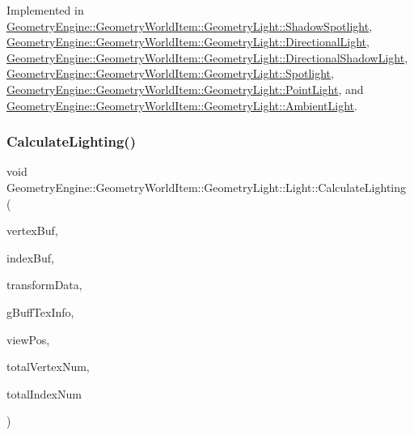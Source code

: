 Implemented in \mbox{\hyperlink{class_geometry_engine_1_1_geometry_world_item_1_1_geometry_light_1_1_shadow_spotlight_a27163f2f8903220d7eaae7aa70c9d6e6}{Geometry\+Engine\+::\+Geometry\+World\+Item\+::\+Geometry\+Light\+::\+Shadow\+Spotlight}}, \mbox{\hyperlink{class_geometry_engine_1_1_geometry_world_item_1_1_geometry_light_1_1_directional_light_af1eac6f1aac9388efe95e1a898cf600f}{Geometry\+Engine\+::\+Geometry\+World\+Item\+::\+Geometry\+Light\+::\+Directional\+Light}}, \mbox{\hyperlink{class_geometry_engine_1_1_geometry_world_item_1_1_geometry_light_1_1_directional_shadow_light_a712d0b0a0573ebd246a4a8aa6b2b667a}{Geometry\+Engine\+::\+Geometry\+World\+Item\+::\+Geometry\+Light\+::\+Directional\+Shadow\+Light}}, \mbox{\hyperlink{class_geometry_engine_1_1_geometry_world_item_1_1_geometry_light_1_1_spotlight_a6136ca2338a7b5f5be70ccab82fe655e}{Geometry\+Engine\+::\+Geometry\+World\+Item\+::\+Geometry\+Light\+::\+Spotlight}}, \mbox{\hyperlink{class_geometry_engine_1_1_geometry_world_item_1_1_geometry_light_1_1_point_light_aa30244fd20e61fdfe1ac1d85c99fd154}{Geometry\+Engine\+::\+Geometry\+World\+Item\+::\+Geometry\+Light\+::\+Point\+Light}}, and \mbox{\hyperlink{class_geometry_engine_1_1_geometry_world_item_1_1_geometry_light_1_1_ambient_light_a4f1d4fb9ad25626e15c28de03b610b4f}{Geometry\+Engine\+::\+Geometry\+World\+Item\+::\+Geometry\+Light\+::\+Ambient\+Light}}.

\mbox{\label{class_geometry_engine_1_1_geometry_world_item_1_1_geometry_light_1_1_light_a4a133e49941a68ac8c33f757e687c8b7}} 
\subsubsection{\texorpdfstring{CalculateLighting()}{CalculateLighting()}}
{\footnotesize\ttfamily void Geometry\+Engine\+::\+Geometry\+World\+Item\+::\+Geometry\+Light\+::\+Light\+::\+Calculate\+Lighting (\begin{DoxyParamCaption}\item[{Q\+Open\+G\+L\+Buffer $\ast$}]{vertex\+Buf,  }\item[{Q\+Open\+G\+L\+Buffer $\ast$}]{index\+Buf,  }\item[{const \mbox{\hyperlink{struct_geometry_engine_1_1_lighting_transformation_data}{Lighting\+Transformation\+Data}} \&}]{transform\+Data,  }\item[{const \mbox{\hyperlink{struct_geometry_engine_1_1_g_buffer_texture_info}{G\+Buffer\+Texture\+Info}} \&}]{g\+Buff\+Tex\+Info,  }\item[{const Q\+Vector3D \&}]{view\+Pos,  }\item[{unsigned int}]{total\+Vertex\+Num,  }\item[{unsigned int}]{total\+Index\+Num }\end{DoxyParamCaption})\hspace{0.3cm}{\ttfamily [virtual]}}

